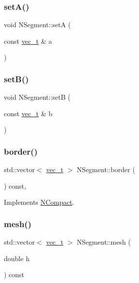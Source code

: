 \subsubsection{\texorpdfstring{setA()}{setA()}}
{\footnotesize\ttfamily void N\+Segment\+::setA (\begin{DoxyParamCaption}\item[{const \mbox{\hyperlink{group___n_algebra_ga0a2cfc67e738a3d73e4f12098c4c07f6}{vec\+\_\+t}} \&}]{a }\end{DoxyParamCaption})}

\mbox{\label{class_n_segment_a02094cbbe46d7c647299ecdde05ce592}} 
\subsubsection{\texorpdfstring{setB()}{setB()}}
{\footnotesize\ttfamily void N\+Segment\+::setB (\begin{DoxyParamCaption}\item[{const \mbox{\hyperlink{group___n_algebra_ga0a2cfc67e738a3d73e4f12098c4c07f6}{vec\+\_\+t}} \&}]{b }\end{DoxyParamCaption})}

\mbox{\label{class_n_segment_a0ef102ed1c0751ae4a9a2e52bf0736da}} 
\subsubsection{\texorpdfstring{border()}{border()}}
{\footnotesize\ttfamily std\+::vector$<$ \mbox{\hyperlink{group___n_algebra_ga0a2cfc67e738a3d73e4f12098c4c07f6}{vec\+\_\+t}} $>$ N\+Segment\+::border (\begin{DoxyParamCaption}{ }\end{DoxyParamCaption}) const\hspace{0.3cm}{\ttfamily [override]}, {\ttfamily [virtual]}}



Implements \mbox{\hyperlink{class_n_compact_af7acc50099e80fc13ce32c97e6857308}{N\+Compact}}.

\mbox{\label{class_n_segment_a49473aeaa477736a7863e60607e045e0}} 
\subsubsection{\texorpdfstring{mesh()}{mesh()}\hspace{0.1cm}{\footnotesize\ttfamily [1/2]}}
{\footnotesize\ttfamily std\+::vector$<$ \mbox{\hyperlink{group___n_algebra_ga0a2cfc67e738a3d73e4f12098c4c07f6}{vec\+\_\+t}} $>$ N\+Segment\+::mesh (\begin{DoxyParamCaption}\item[{double}]{h }\end{DoxyParamCaption}) const}


